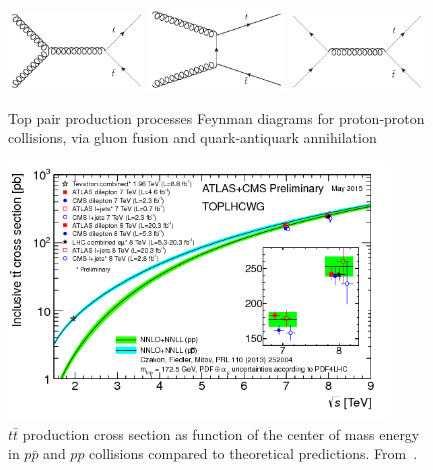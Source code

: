 \begin{figure}[!Hhtbp]
  \begin{center}
    \includegraphics[width=0.32\textwidth]{figs/Gluon_fusion_top_pair.jpg}
    \includegraphics[width=0.32\textwidth]{figs/Gluon_tchannel_top_pair.jpg}
    \includegraphics[width=0.32\textwidth]{figs/Quarks_schannel_top_pair.jpg}
    \caption{Top pair production processes Feynman diagrams for proton-proton collisions, via gluon fusion and quark-antiquark annihilation}
    \label{fig:PairProductionFD}
  \end{center}
\end{figure}

\begin{figure}[!Hhtbp]
  \begin{center}
    \includegraphics[width=0.9\textwidth]{figs/toplhcwg_ttxsec_sqrts_may2015.png}
    \caption{$t\bar{t}$ production cross section as function of the center of mass energy in $p\bar{p}$ and $pp$ collisions compared to theoretical predictions. From~\cite{TOPLHCWG}.}
    \label{fig:PairProduction}
  \end{center}
\end{figure}

